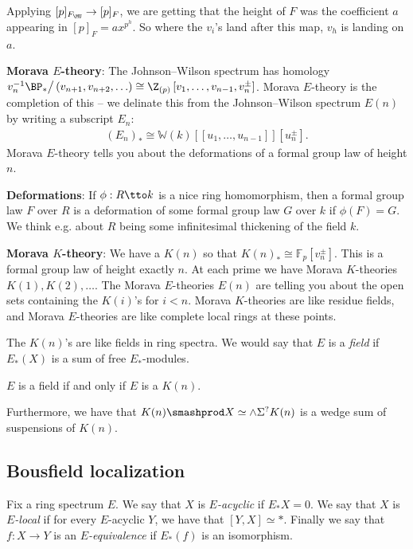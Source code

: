 Applying $[p]_{F_\MU} \to [p]_F$, we are getting that the height of $F$ was the coefficient $a$ appearing in $[p]_F = ax^{p^h}$. So where the $v_i$'s land after this map, $v_h$ is landing on $a$.

\textbf{Morava $E$-theory}: The Johnson--Wilson spectrum has homology $v_n^{-1} \BP_\ast \big/ \left( v_{n+1}, v_{n+2}, \ldots \right) \cong \Z_{(p)} \left[ v_1, \ldots, v_{n-1}, v_n^{\pm} \right]$. Morava $E$-theory is the completion of this -- we delinate this from the Johnson--Wilson spectrum $E(n)$ by writing a subscript $E_n$:
\begin{align*}
    (E_n)_\ast \cong \mathbb{W}(k) \left[ [ u_1, \ldots, u_{n-1} ] \right] \left[ u_n^\pm \right].
\end{align*}
Morava $E$-theory tells you about the deformations of a formal group law of height $n$.

\textbf{Deformations}: If $\phi : R \tto k$ is a nice ring homomorphism, then a formal group law $F$ over $R$ is a deformation of some formal group law $G$ over $k$ if $\phi(F) = G$. We think e.g. about $R$ being some infinitesimal thickening of the field $k$.

\textbf{Morava $K$-theory}: We have a $K(n)$ so that $K(n)_\ast \cong \mathbb{F}_p \left[ v_n^{\pm} \right]$. This is a formal group law of height exactly $n$. At each prime we have Morava $K$-theories $K(1), K(2), \ldots$. The Morava $E$-theories $E(n)$ are telling you about the open sets containing the $K(i)$'s for $i<n$. Morava $K$-theories are like residue fields, and Morava $E$-theories are like complete local rings at these points.

The $K(n)$'s are like fields in ring spectra. We would say that $E$ is a \textit{field} if $E_\ast(X)$ is a sum of free $E_\ast$-modules.

\begin{theorem} $E$ is a field if and only if $E$ is a $K(n)$.
\end{theorem}

Furthermore, we have that $K(n) \smashprod X \simeq \wedge \Sigma^? K(n)$ is a wedge sum of suspensions of $K(n)$.

\subsection{Bousfield localization}

Fix a ring spectrum $E$. We say that $X$ is $E$\textit{-acyclic} if $E_\ast X = 0$. We say that $X$ is $E$\textit{-local} if for every $E$-acyclic $Y$, we have that $\left[ Y,X \right]\simeq \ast$. Finally we say that $f: X \to Y$ is an $E$\textit{-equivalence} if $E_\ast(f)$ is an isomorphism.


